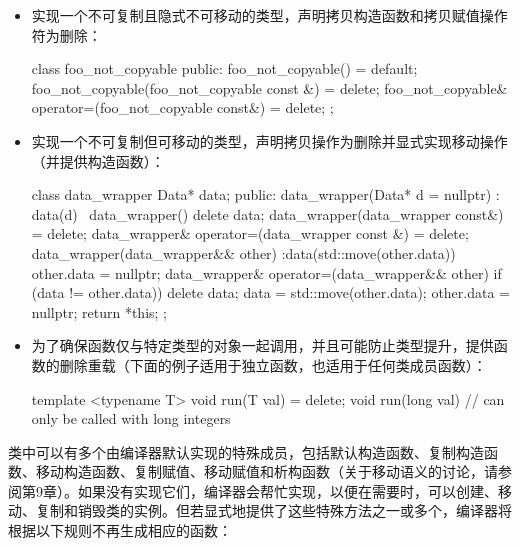 \begin{itemize}
\item
实现一个不可复制且隐式不可移动的类型，声明拷贝构造函数和拷贝赋值操作符为删除：

\begin{cpp}
class foo_not_copyable
{
    public:
    foo_not_copyable() = default;
    foo_not_copyable(foo_not_copyable const &) = delete;
    foo_not_copyable& operator=(foo_not_copyable const&) = delete;
};
\end{cpp}

\item
实现一个不可复制但可移动的类型，声明拷贝操作为删除并显式实现移动操作（并提供构造函数）：

\begin{cpp}
class data_wrapper
{
    Data* data;
public:
    data_wrapper(Data* d = nullptr) : data(d) {}
    ~data_wrapper() { delete data; }
    data_wrapper(data_wrapper const&) = delete;
    data_wrapper& operator=(data_wrapper const &) = delete;
    data_wrapper(data_wrapper&& other)
    :data(std::move(other.data))
    {
        other.data = nullptr;
    }
    data_wrapper& operator=(data_wrapper&& other)
    {
        if (data != other.data))
        {
            delete data;
            data = std::move(other.data);
            other.data = nullptr;
        }
        return *this;
    }
};
\end{cpp}

\item
为了确保函数仅与特定类型的对象一起调用，并且可能防止类型提升，提供函数的删除重载（下面的例子适用于独立函数，也适用于任何类成员函数）：

\begin{cpp}
template <typename T>
void run(T val) = delete;
void run(long val) {} // can only be called with long integers
\end{cpp}
\end{itemize}


类中可以有多个由编译器默认实现的特殊成员，包括默认构造函数、复制构造函数、移动构造函数、复制赋值、移动赋值和析构函数（关于移动语义的讨论，请参阅第9章）。如果没有实现它们，编译器会帮忙实现，以便在需要时，可以创建、移动、复制和销毁类的实例。但若显式地提供了这些特殊方法之一或多个，编译器将根据以下规则不再生成相应的函数：

